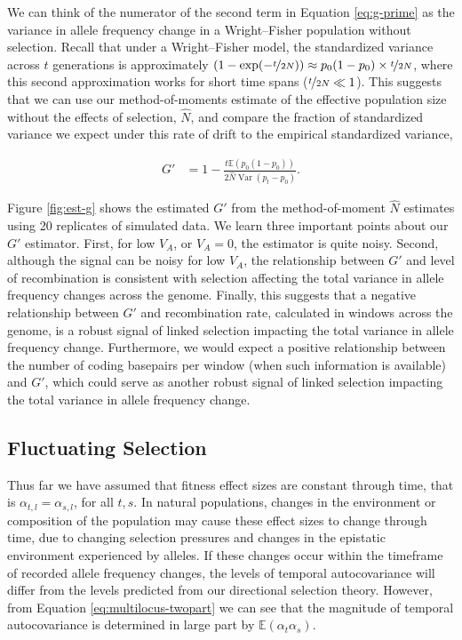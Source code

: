 \documentclass[11pt]{article}
\newcommand{\E}{\mathbb{E}}
\DeclareMathOperator{\var}{Var}
\begin{document}
We can think of the numerator of the second term in Equation \eqref{eq:g-prime}
as the variance in allele frequency change in a Wright--Fisher population
without selection.  Recall that under a Wright--Fisher model, the standardized
variance across $t$ generations is approximately $(1 - \exp(-\nicefrac{t}{2N}))
\approx p_0(1-p_0) \times \nicefrac{t}{2N}$, where this second approximation
works for short time spans ($\nicefrac{t}{2N} \ll 1$).  This suggests that we
can use our method-of-moments estimate of the effective population size without
the effects of selection, $\widehat{N}$, and compare the fraction of
standardized variance we expect under this rate of drift to the empirical
standardized variance,

\begin{align}
  G' &= 1 - \frac{t \E(p_{0}(1-p_{0})) }{2 \widehat{N} \var(p_{t} - p_{0}) }.
\end{align}

Figure \ref{fig:est-g} shows the estimated $G'$ from the method-of-moment
$\widehat{N}$ estimates using 20 replicates of simulated data. We learn
three important points about our $G'$ estimator. First, for low $V_A$, or $V_A
= 0$, the estimator is quite noisy. Second, although the signal can be noisy
for low $V_A$, the relationship between $G'$ and level of recombination is
consistent with selection affecting the total variance in allele frequency
changes across the genome. Finally, this suggests that a negative relationship
between $G'$ and recombination rate, calculated in windows across the genome,
is a robust signal of linked selection impacting the total variance in allele
frequency change. Furthermore, we would expect a positive relationship between
the number of coding basepairs per window (when such information is available)
and $G'$, which could serve as another robust signal of linked selection
impacting the total variance in allele frequency change.

\subsection{Fluctuating Selection}
\label{sec:fluct-sel}

Thus far we have assumed that fitness effect sizes are constant through time,
that is $\alpha_{t,l} =  \alpha_{s,l}$, for all $t, s$. In natural populations,
changes in the environment or composition of the population may cause these
effect sizes to change through time, due to changing selection pressures and
changes in the epistatic environment experienced by alleles. If these changes
occur within the timeframe of recorded allele frequency changes, the levels of
temporal autocovariance will differ from the levels predicted from our
directional selection theory. However, from Equation
\eqref{eq:multilocus-twopart} we can see that the magnitude of temporal
autocovariance is determined in large part by $\E(\alpha_t \alpha_s)$.
\end{document}
